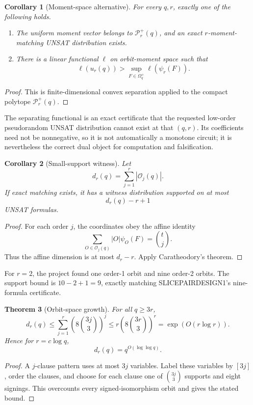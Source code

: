 \documentclass[11pt]{article}
\newtheorem{theorem}{Theorem}
\newtheorem{corollary}[theorem]{Corollary}
\begin{document}
\begin{corollary}[Moment-space alternative]
For every $q,r$, exactly one of the following holds.
\begin{enumerate}
\item The uniform moment vector belongs to $\mathcal P_r^+(q)$, and an exact $r$-moment-matching UNSAT distribution exists.
\item There is a linear functional $\ell$ on orbit-moment space such that
\[
\ell(u_r(q))>\sup_{F\in\Omega_q^+}\ell(\psi_r(F)).
\]
\end{enumerate}
\end{corollary}
\begin{proof}
This is finite-dimensional convex separation applied to the compact polytope $\mathcal P_r^+(q)$.
\end{proof}
The separating functional is an exact certificate that the requested low-order pseudorandom UNSAT distribution cannot exist at that $(q,r)$. Its coefficients need not be nonnegative, so it is not automatically a monotone circuit; it is nevertheless the correct dual object for computation and falsification.

\begin{corollary}[Small-support witness]
Let
\[
d_r(q)=\sum_{j=1}^r|\mathcal O_j(q)|.
\]
If exact matching exists, it has a witness distribution supported on at most
\[
d_r(q)-r+1
\]
UNSAT formulas.
\end{corollary}
\begin{proof}
For each order $j$, the coordinates obey the affine identity
\[
\sum_{O\in\mathcal O_j(q)}|O|\psi_O(F)=\binom tj.
\]
Thus the affine dimension is at most $d_r-r$. Apply Caratheodory's theorem.
\end{proof}

For $r=2$, the project found one order-1 orbit and nine order-2 orbits. The support bound is $10-2+1=9$, exactly matching SLICEPAIRDESIGN1's nine-formula certificate.

\begin{theorem}[Orbit-space growth]
For all $q\ge3r$,
\[
d_r(q)\le\sum_{j=1}^r\left(8\binom{3j}{3}\right)^j
\le r\left(8\binom{3r}{3}\right)^r
=\exp(O(r\log r)).
\]
Hence for $r=c\log q$,
\[
d_r(q)=q^{O(\log\log q)}.
\]
\end{theorem}
\begin{proof}
A $j$-clause pattern uses at most $3j$ variables. Label these variables by $[3j]$, order the clauses, and choose for each clause one of $\binom{3j}{3}$ supports and eight signings. This overcounts every signed-isomorphism orbit and gives the stated bound.
\end{proof}
\end{document}
